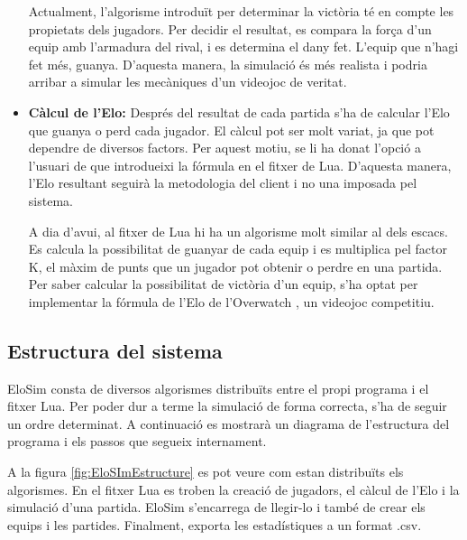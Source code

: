 \documentclass[a4paper]{article}
\begin{document}
\begin{itemize}
    Actualment, l'algorisme introduït per determinar la victòria té en compte les propietats dels jugadors. Per decidir el resultat, es compara la força d'un equip amb l'armadura del rival, i es determina el dany fet. L'equip que n'hagi fet més, guanya. D'aquesta manera, la simulació és més realista i podria arribar a simular les mecàniques d'un videojoc de veritat.

    \item \textbf{Càlcul de l'Elo:} Després del resultat de cada partida s'ha de calcular l'Elo que guanya o perd cada jugador. El càlcul pot ser molt variat, ja que pot dependre de diversos factors. Per aquest motiu, se li ha donat l'opció a l'usuari de que introdueixi la fórmula en el fitxer de Lua. D'aquesta manera, l'Elo resultant seguirà la metodologia del client i no una imposada pel sistema. 
    
    A dia d'avui, al fitxer de Lua hi ha un algorisme molt similar al dels escacs. Es calcula la possibilitat de guanyar de cada equip i es multiplica pel factor K, el màxim de punts que un jugador pot obtenir o perdre en una partida. Per saber calcular la possibilitat de victòria d'un equip, s'ha optat per implementar la fórmula de l'Elo de l'Overwatch \cite{overwatchElo}, un videojoc competitiu.
\end{itemize}

\newpage

\subsection{Estructura del sistema}

EloSim consta de diversos algorismes distribuïts entre el propi programa i el fitxer Lua. Per poder dur a terme la simulació de forma correcta, s'ha de seguir un ordre determinat. A continuació es mostrarà un diagrama de l'estructura del programa i els passos que segueix internament.

A la figura \ref{fig:EloSImEstructure} es pot veure com estan distribuïts els algorismes. En el fitxer Lua es troben la creació de jugadors, el càlcul de l'Elo i la simulació d'una partida. EloSim s'encarrega de llegir-lo i també de crear els equips i les partides. Finalment, exporta les estadístiques a un format .csv.
\end{document}

